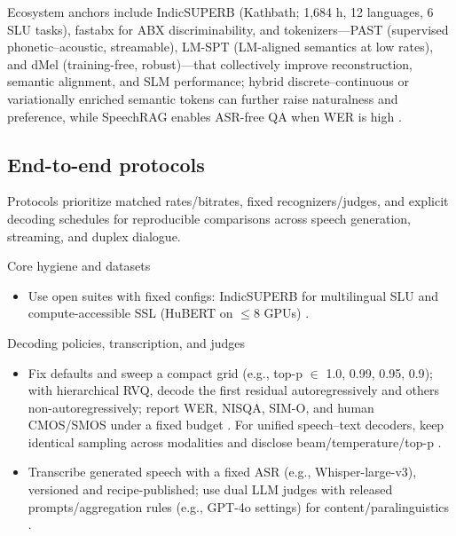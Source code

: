 \documentclass{article}
\begin{document}
Ecosystem anchors include IndicSUPERB (Kathbath; 1,684 h, 12 languages, 6 SLU tasks), fastabx for ABX discriminability, and tokenizers---PAST (supervised phonetic--acoustic, streamable), LM-SPT (LM-aligned semantics at low rates), and dMel (training-free, robust)---that collectively improve reconstruction, semantic alignment, and SLM performance; hybrid discrete--continuous or variationally enriched semantic tokens can further raise naturalness and preference, while SpeechRAG enables ASR-free QA when WER is high \cite{entry2025indicsuperbspeechprocessinguniversalperf,poli2025fastabxlibraryefficientcomputationabxdis,har-tuv2025pastphoneticacousticspeechtokenizer,jo2025lmsptalignedsemanticdistillationspeechto,bai2025dmelspeechtokenizationmadesimple,verma2024whispergpthybridrepresentationaudiolarge,chen2025variationalframeworkimprovingnaturalness,min2025speechretrievalaugmentedgenerationwithou}.

\subsection{End-to-end protocols} \label{subsec:End-to-end protocols}
Protocols prioritize matched rates/bitrates, fixed recognizers/judges, and explicit decoding schedules for reproducible comparisons across speech generation, streaming, and duplex dialogue.

Core hygiene and datasets
\begin{itemize}
  \item Use open suites with fixed configs: IndicSUPERB for multilingual SLU and compute-accessible SSL (HuBERT on $\le$8 GPUs) \cite{entry2025indicsuperbspeechprocessinguniversalperf,chen2023reducingbarriersselfsupervisedlearninghu}.
\end{itemize}

Decoding policies, transcription, and judges
\begin{itemize}
  \item Fix defaults and sweep a compact grid (e.g., top-p $\in$ {1.0, 0.99, 0.95, 0.9}); with hierarchical RVQ, decode the first residual autoregressively and others non-autoregressively; report WER, NISQA, SIM-O, and human CMOS/SMOS under a fixed budget \cite{li2024investigatingneuralaudiocodecsspeechlang}. For unified speech--text decoders, keep identical sampling across modalities and disclose beam/temperature/top-p \cite{huang2025dynamicsuperbphase2collaborativelyexpand}.
  \item Transcribe generated speech with a fixed ASR (e.g., Whisper-large-v3), versioned and recipe-published; use dual LLM judges with released prompts/aggregation rules (e.g., GPT-4o settings) for content/paralinguistics \cite{wang2025incorporatingcontextualparalinguisticund,wang2024blspemotowardsempatheticlargespeechlangu}.
\end{itemize}
\end{document}
